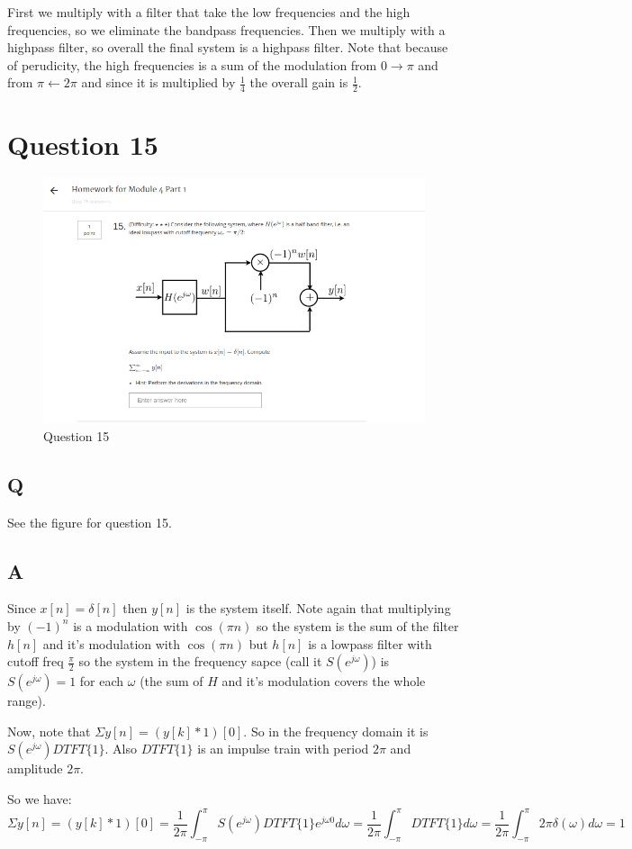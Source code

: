 \documentclass[a4paper]{article}
\begin{document}
First we multiply with a filter that take the low frequencies and the high frequencies, so we
eliminate the bandpass frequencies.
Then we multiply with a highpass filter, so overall the final system is a highpass filter.
Note that because of perudicity, the high frequencies is a sum of the modulation from $0 \rightarrow \pi$ and
from $\pi \leftarrow 2\pi$ and since it is multiplied by $\frac{1}{4}$ the overall gain is $\frac{1}{2}$.

\section{Question 15}
 \begin{figure}
\centering
\includegraphics[width=1\textwidth]{week5_q15.png}
\caption{\label{week5_q15}Question 15}
\end{figure}

\subsection{Q}
See the figure for question 15.

\subsection{A}
Since $x[n] = \delta[n]$ then $y[n]$ is the system itself. Note again that multiplying by $(-1)^n$
is a modulation with $\cos(\pi n)$ so the system is the sum of the filter $h[n]$ and it's modulation with
$\cos(\pi n)$ but $h[n]$ is a lowpass filter with cutoff freq $\frac{\pi}{2}$ so the system in the frequency sapce (call it $S(e^{j\omega})$) is $S(e^{j\omega}) = 1$ for each $\omega$ (the sum of $H$ and it's modulation covers the whole range).


Now, note that $\Sigma y[n] = (y[k]\ast 1)[0]$. So in the frequency domain it is $S(e^{j\omega}) DTFT\{1\}$.
Also $DTFT\{1\}$ is an impulse train with period $2\pi$ and amplitude $2\pi$.

So we have:
$$
\Sigma y[n] = (y[k]\ast 1)[0] = \frac{1}{2\pi} \int_{-\pi}^{\pi}S(e^{j\omega}) DTFT\{1\}e^{j\omega 0}d\omega = \frac{1}{2\pi} \int_{-\pi}^{\pi}DTFT\{1\}d\omega = \frac{1}{2\pi} \int_{-\pi}^{\pi}2\pi\delta(\omega)d\omega = 1
$$
\end{document}
